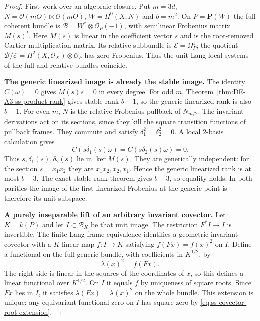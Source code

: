 \begin{proof}
First work over an algebraic closure. Put $m=3d$,
$N=\mathcal O(mO)\boxtimes\mathcal O(mO)$,
$W=H^0(X,N)$ and $b=m^2$. On $P=\mathbf P(W)$ the full coherent
bundle is $\mathcal B=W^*\otimes\mathcal O_P(-1)$, with semilinear
Frobenius matrix $M(s)^t$. Here $M(s)$ is linear in the coefficient
vector $s$ and is the root-removed Cartier multiplication matrix.
Its relative subbundle is $\mathcal E=\Omega_P^1$; the quotient
$\mathcal B/\mathcal E=H^2(X,\mathcal O_X)\otimes\mathcal O_P$
has zero Frobenius. Thus the unit Lang local systems of the full
and relative bundles coincide.

\par\smallskip\noindent\textbf{The generic linearized image is already the stable image.}
The identity $C(\omega)=0$ gives $M(s)s=0$ in every degree.
For odd $m$, Theorem~\ref{thm:DE-A3-ss-product-rank} gives stable
rank $b-1$, so the generic linearized rank is also $b-1$.
For even $m$, $N$ is the relative Frobenius pullback of $N_{m/2}$.
The invariant derivations act on its sections, since they kill the
square transition functions of pullback frames. They commute and
satisfy $\delta_1^2=\delta_2^2=0$. A local $2$-basis calculation gives
\[
 C(s\delta_1(s)\omega)=C(s\delta_2(s)\omega)=0.
\]
Thus $s,\delta_1(s),\delta_2(s)$ lie in $\ker M(s)$.
They are generically independent: for the section $s=x_1x_2$
they are $x_1x_2,x_2,x_1$. Hence the generic linearized rank is
at most $b-3$. The exact stable-rank theorem gives $b-3$, so
equality holds. In both parities the image of the first linearized
Frobenius at the generic point is therefore its unit subspace.

\par\smallskip\noindent\textbf{A purely inseparable lift of an arbitrary invariant covector.}
Let $K=k(P)$ and let $I\subset\mathcal B_K$ be that unit image.
The restriction $F^*I\to I$ is invertible. The finite Lang-frame
equivalence identifies a geometric invariant covector with a
$K$-linear map $f:I\to K$ satisfying
$f(Fx)=f(x)^2$ on $I$. Define a functional on the full generic
bundle, with coefficients in $K^{1/2}$, by
\begin{equation}\label{eq:ss-covector-root-extension}
                  \lambda(x)^2=f(Fx).
\end{equation}
The right side is linear in the squares of the coordinates of $x$,
so this defines a linear functional over $K^{1/2}$. On $I$ it
equals $f$ by uniqueness of square roots. Since $Fx$ lies in $I$,
it satisfies $\lambda(Fx)=\lambda(x)^2$ on the whole bundle.
This extension is unique: any equivariant functional zero on $I$
has square zero by \eqref{eq:ss-covector-root-extension}.


\end{proof}
